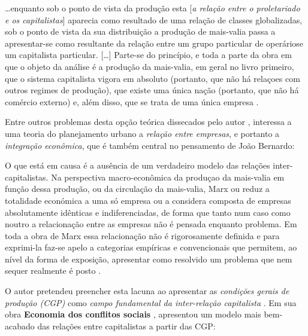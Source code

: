 \begin{citacao}
\dots enquanto sob o ponto de vista da produção esta [\textit{a relação entre o proletariado e os capitalistas}] aparecia como resultado de uma relação de classes globalizadas, sob o ponto de vista da sua distribuição a produção de mais-valia passa a apresentar-se como resultante da relação entre um grupo particular de operáriose um capitalista particular. [\dots] Parte-se do princípio, e toda a parte da obra em que o objeto da análise é a produção da mais-valia, em geral no livro primeiro, que o sistema capitalista vigora em absoluto (portanto, que não há relaçoes com outros regimes de produção), que existe uma única nação (portanto, que não há comércio externo) e, além disso, que se trata de uma única empresa \cite[p.~10-11]{BERNARDO1977b}.
\end{citacao}

Entre outros problemas desta opção teórica dissecados pelo autor \cite[p.~7-21]{BERNARDO1977b}, interessa a uma teoria do planejamento urbano a \textit{relação entre empresas}, e portanto a \textit{integração econômica}, que é também central no pensamento de João Bernardo:

\begin{citacao}
O que está em causa é a ausência de um verdadeiro modelo das relações inter-capitalistas. Na perspectiva macro-econômica da produçao da mais-valia em função dessa produção, ou da circulação da mais-valia, Marx ou reduz a totalidade económica a uma só empresa ou a considera composta de empresas absolutamente idênticas e indiferenciadas, de forma que tanto num caso como noutro a relacionação entre as empresas não é pensada enquanto problema. Em toda a obra de Marx essa relacionação não é rigorosamente definida e para exprimi-la faz-se apelo a categorias empíricas e convencionais que permitem, ao nível da forma de exposição, apresentar como resolvido um problema que nem sequer realmente é posto \cite[p.~21]{BERNARDO1977b}.
\end{citacao}

O autor pretendeu preencher esta lacuna ao apresentar as \textit{condições gerais de produção (CGP)} como \textit{campo fundamental da inter-relação capitalista} \cite[p.~110-115]{BERNARDO1977b}. Em sua obra \textbf{Economia dos conflitos sociais} \cite{BERNARDO1991}, apresentou um modelo mais bem-acabado das relações entre capitalistas a partir das CGP:

